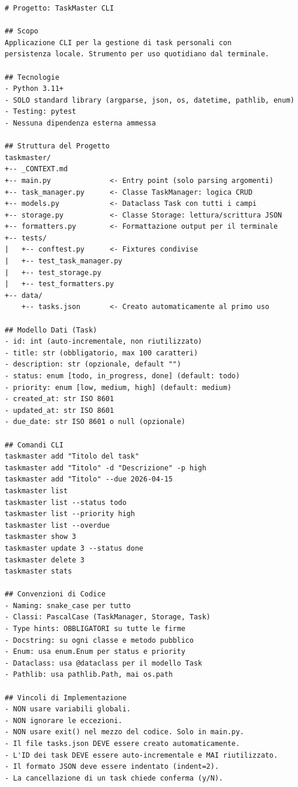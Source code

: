 \begin{lstlisting}[language={},title={\texttt{\_CONTEXT.md} per TaskMaster CLI}]
# Progetto: TaskMaster CLI

## Scopo
Applicazione CLI per la gestione di task personali con
persistenza locale. Strumento per uso quotidiano dal terminale.

## Tecnologie
- Python 3.11+
- SOLO standard library (argparse, json, os, datetime, pathlib, enum)
- Testing: pytest
- Nessuna dipendenza esterna ammessa

## Struttura del Progetto
taskmaster/
+-- _CONTEXT.md
+-- main.py              <- Entry point (solo parsing argomenti)
+-- task_manager.py      <- Classe TaskManager: logica CRUD
+-- models.py            <- Dataclass Task con tutti i campi
+-- storage.py           <- Classe Storage: lettura/scrittura JSON
+-- formatters.py        <- Formattazione output per il terminale
+-- tests/
|   +-- conftest.py      <- Fixtures condivise
|   +-- test_task_manager.py
|   +-- test_storage.py
|   +-- test_formatters.py
+-- data/
    +-- tasks.json       <- Creato automaticamente al primo uso

## Modello Dati (Task)
- id: int (auto-incrementale, non riutilizzato)
- title: str (obbligatorio, max 100 caratteri)
- description: str (opzionale, default "")
- status: enum [todo, in_progress, done] (default: todo)
- priority: enum [low, medium, high] (default: medium)
- created_at: str ISO 8601
- updated_at: str ISO 8601
- due_date: str ISO 8601 o null (opzionale)

## Comandi CLI
taskmaster add "Titolo del task"
taskmaster add "Titolo" -d "Descrizione" -p high
taskmaster add "Titolo" --due 2026-04-15
taskmaster list
taskmaster list --status todo
taskmaster list --priority high
taskmaster list --overdue
taskmaster show 3
taskmaster update 3 --status done
taskmaster delete 3
taskmaster stats

## Convenzioni di Codice
- Naming: snake_case per tutto
- Classi: PascalCase (TaskManager, Storage, Task)
- Type hints: OBBLIGATORI su tutte le firme
- Docstring: su ogni classe e metodo pubblico
- Enum: usa enum.Enum per status e priority
- Dataclass: usa @dataclass per il modello Task
- Pathlib: usa pathlib.Path, mai os.path

## Vincoli di Implementazione
- NON usare variabili globali.
- NON ignorare le eccezioni.
- NON usare exit() nel mezzo del codice. Solo in main.py.
- Il file tasks.json DEVE essere creato automaticamente.
- L'ID dei task DEVE essere auto-incrementale e MAI riutilizzato.
- Il formato JSON deve essere indentato (indent=2).
- La cancellazione di un task chiede conferma (y/N).
\end{lstlisting}

